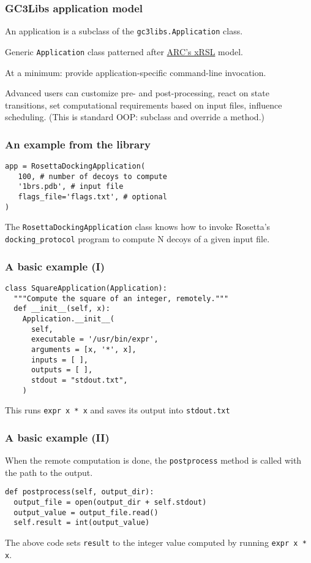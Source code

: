 \documentclass[presentation]{beamer}
\begin{document}
\begin{frame}
\frametitle{GC3Libs application model}
\label{sec-8}

  An application is a subclass of the \texttt{gc3libs.Application} class.

  Generic \texttt{Application} class patterned after \href{http://www.nordugrid.org/documents/xrsl.pdf}{ARC's xRSL} model.

  At a minimum: provide application-specific command-line invocation.

  Advanced users can customize pre- and post-processing, react on
  state transitions, set computational requirements based on input
  files, influence scheduling.  (This is standard OOP: subclass and
  override a method.)
\end{frame}
\begin{frame}[fragile]
\frametitle{An example from the library}
\label{sec-9}

\begin{verbatim}
app = RosettaDockingApplication(
   100, # number of decoys to compute
   '1brs.pdb', # input file
   flags_file='flags.txt', # optional
)
\end{verbatim}

  The \texttt{RosettaDockingApplication} class knows how to invoke Rosetta's
  \texttt{docking\_protocol} program to compute N decoys of a given input file.
\end{frame}
\begin{frame}[fragile]
\frametitle{A basic example (I)}
\label{sec-10}

\begin{verbatim}
class SquareApplication(Application):
  """Compute the square of an integer, remotely."""
  def __init__(self, x):
    Application.__init__(
      self,
      executable = '/usr/bin/expr',
      arguments = [x, '*', x],
      inputs = [ ],
      outputs = [ ],
      stdout = "stdout.txt",
    )
\end{verbatim}
  This runs \texttt{expr x * x} and saves its output into \texttt{stdout.txt}
\end{frame}
\begin{frame}[fragile]
\frametitle{A basic example (II)}
\label{sec-11}

  When the remote computation is done, the \texttt{postprocess} method is
  called with the path to the output.
\begin{verbatim}
def postprocess(self, output_dir):
  output_file = open(output_dir + self.stdout)
  output_value = output_file.read()
  self.result = int(output_value)
\end{verbatim}
  The above code sets \texttt{result} to the integer value computed by
  running \texttt{expr x * x}.
\end{frame}
\end{document}

